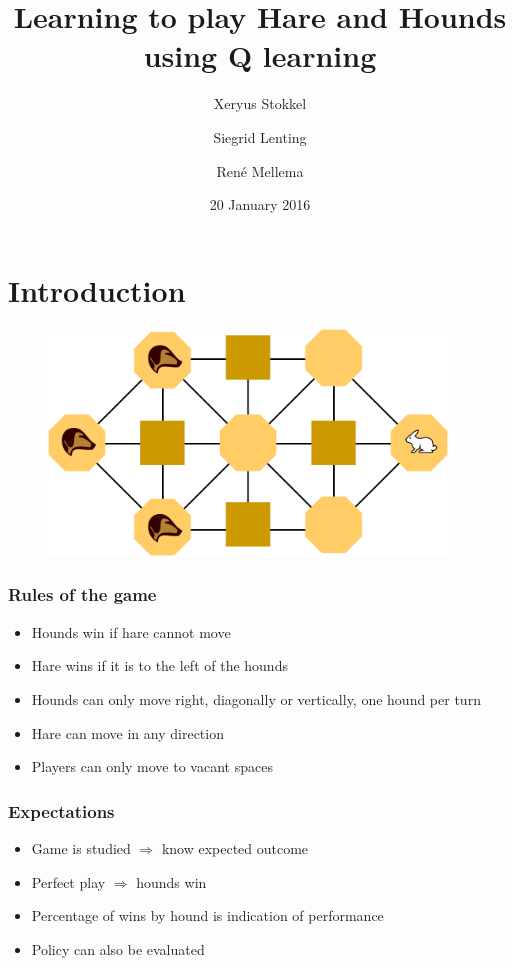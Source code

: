 \documentclass{beamer}
\title{Learning to play Hare and Hounds using Q learning}
\author{Xeryus Stokkel \and Siegrid Lenting \and Ren\'e Mellema}
\date{20 January 2016}
\begin{document}
\begin{frame}
    \maketitle
\end{frame}

\section{Introduction}
\begin{frame}
	\begin{figure}
		\centering
		\includegraphics[width=300pt]{Hare_and_Hounds_board.png}
		\label{fig:Hare_and_Hounds_board}
	\end{figure}		
\end{frame}

\begin{frame}
    \frametitle{Rules of the game}
    \begin{itemize}
        \item Hounds win if hare cannot move
        \item Hare wins if it is to the left of the hounds
        \item Hounds can only move right, diagonally or vertically, one hound per turn
        \item Hare can move in any direction
        \item Players can only move to vacant spaces
    \end{itemize}
\end{frame}

\begin{frame}
    \frametitle{Expectations}
    \begin{itemize}[<+->]
        \item Game is studied $\Rightarrow$ know expected outcome
        \item Perfect play $\Rightarrow$ hounds win
        \item Percentage of wins by hound is indication of performance
        \item Policy can also be evaluated
    \end{itemize}
\end{frame}
\end{document}

